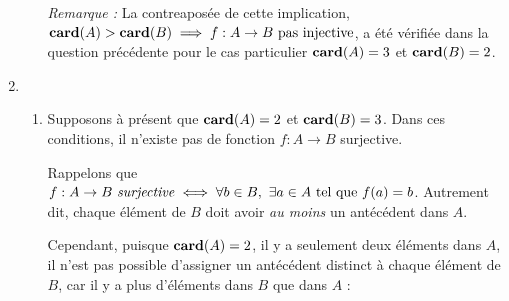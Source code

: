 \begin{exercice}
\begin{enumerate}
\begin{enumerate}
        \textit{Remarque :} La contreaposée de cette implication, $\mathbf{card}(A) > \mathbf{card}(B) \implies f:A\rightarrow B \text{ pas injective}$, a été vérifiée dans la question précédente pour le cas particulier $\mathbf{card}(A)=3$ et $\mathbf{card}(B)=2$.




        
    \end{enumerate}

    \item
    \begin{enumerate}
        \item Supposons à présent que $\mathbf{card}(A)=2$ et $\mathbf{card}(B)=3$. Dans ces conditions, il n'existe pas de fonction $f:A\rightarrow B$ surjective.

        Rappelons que $f:A\rightarrow B \text{ \textit{surjective}} \iff \forall b \in B, \ \exists a \in A \text{ tel que } f(a) = b$. Autrement dit, chaque élément de $B$ doit avoir \textit{au moins} un antécédent dans $A$.

        Cependant, puisque $\mathbf{card}(A)=2$, il y a seulement deux éléments dans $A$, il n'est pas possible d'assigner un antécédent distinct à chaque élément de $B$, car il y a plus d'éléments dans $B$ que dans $A$ :

        \begin{center}
        \end{center}


\end{enumerate}
\end{enumerate}
\end{exercice}

